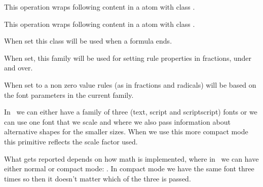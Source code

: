 This operation wraps following content in a atom with class .

\stopoldprimitive

\startoldprimitive[title={\prm {mathrel}}]

This operation wraps following content in a atom with class .

\stopoldprimitive

\startnewprimitive[title={\prm {mathrightclass}}]

When set this class will be used when a formula ends.

\stopnewprimitive

\startnewprimitive[title={\prm {mathrulesfam}}]

When set, this family will be used for setting rule properties in fractions,
under and over.

\stopnewprimitive

\startnewprimitive[title={\prm {mathrulesmode}}]

When set to a non zero value rules (as in fractions and radicals) will be based
on the font parameters in the current family.

\stopnewprimitive

\startnewprimitive[title={\prm {mathscale}}]

In \LUAMETATEX\ we can either have a family of three (text, script and
scriptscript) fonts or we can use one font that we scale and where we also pass
information about alternative shapes for the smaller sizes. When we use this
more compact mode this primitive reflects the scale factor used.

\startbuffer
\im {
    \textstyle        \the\mathscale\textfont        \fam\enspace
    \scriptstyle      \the\mathscale\scriptfont      \fam\enspace
    \scriptscriptstyle\the\mathscale\scriptscriptfont\fam\enspace
    \textstyle        \the\mathscale\textfont        \fam\enspace
    \scriptstyle      \the\mathscale\textfont        \fam\enspace
    \scriptscriptstyle\the\mathscale\textfont        \fam

}
\stopbuffer

What gets reported depends on how math is implemented, where in \CONTEXT\ we can
have either normal or compact mode: \inlinebuffer. In compact mode we have the
same font three times so then it doesn't matter which of the three is passed.

\stopnewprimitive

\startnewprimitive[title={\prm {mathscriptsmode}}]

